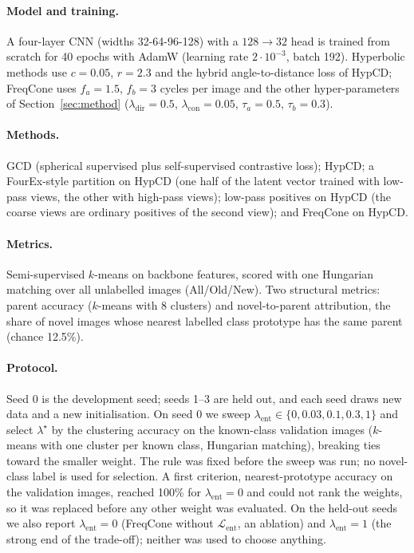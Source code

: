 \documentclass[10pt]{article}
\newcommand{\Lb}{\mathcal{L}}
\begin{document}
\paragraph{Model and training.} A four-layer CNN (widths 32-64-96-128) with a $128\to32$ head is trained from
scratch for 40 epochs with AdamW (learning rate $2\cdot10^{-3}$, batch 192). Hyperbolic methods use $c=0.05$,
$r=2.3$ and the hybrid angle-to-distance loss of HypCD; FreqCone uses $f_a=1.5$, $f_b=3$ cycles per image and the
other hyper-parameters of Section~\ref{sec:method} ($\lambda_{\mathrm{dir}}=0.5$, $\lambda_{\mathrm{con}}=0.05$,
$\tau_a=0.5$, $\tau_b=0.3$).

\paragraph{Methods.} GCD (spherical supervised plus self-supervised contrastive loss); HypCD; a FourEx-style
partition on HypCD (one half of the latent vector trained with low-pass views, the other with high-pass views);
low-pass positives on HypCD (the coarse views are ordinary positives of the second view); and FreqCone on HypCD.

\paragraph{Metrics.} Semi-supervised $k$-means on backbone features, scored with one Hungarian matching over all
unlabelled images (All/Old/New). Two structural metrics: parent accuracy ($k$-means with 8 clusters) and
novel-to-parent attribution, the share of novel images whose nearest labelled class prototype has the same
parent (chance 12.5\%).

\paragraph{Protocol.} Seed 0 is the development seed; seeds 1--3 are held out, and each seed draws new data and
a new initialisation. On seed 0 we sweep $\lambda_{\mathrm{ent}}\in\{0,0.03,0.1,0.3,1\}$ and select
$\lambda^\star$ by the clustering accuracy on the known-class validation images ($k$-means with one cluster per
known class, Hungarian matching), breaking ties toward the smaller weight. The rule was fixed before the sweep
was run; no novel-class label is used for selection. A first criterion, nearest-prototype accuracy on the
validation images, reached 100\% for $\lambda_{\mathrm{ent}}=0$ and could not rank the weights, so it was
replaced before any other weight was evaluated. On the held-out seeds we also report $\lambda_{\mathrm{ent}}=0$
(FreqCone without $\Lb_{\mathrm{ent}}$, an ablation) and $\lambda_{\mathrm{ent}}=1$ (the strong end of the
trade-off); neither was used to choose anything.
\end{document}
